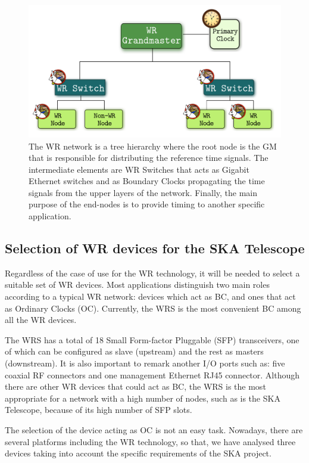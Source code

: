 \begin{figure}[H] \centering \includegraphics[scale=0.4]{img/wr_hierarchy}
	\caption{The WR network is a tree hierarchy where the root node is the
	GM that is responsible for distributing the reference time signals. The
	intermediate elements are WR Switches that acts as Gigabit Ethernet
	switches and as Boundary Clocks propagating the time signals from the
	upper layers of the network. Finally, the main purpose of the end-nodes
	is to provide timing to another specific application.}
\label{fig:wr_hierarchy} \end{figure}

\subsection{Selection of WR devices for the SKA Telescope} \label{subsec:wr-dev}

Regardless of the case of use for the WR technology, it will be needed to select
a suitable set of WR devices. Most applications distinguish two main roles
according to a typical WR network: devices which act as BC, and ones that act as
Ordinary Clocks (OC). Currently, the WRS \cite{ohwr:wrs} is the most convenient
BC among all the WR devices. 

The WRS has a total of 18 Small Form-factor Pluggable (SFP) transceivers, one 
of which can be configured as slave (upstream) and the rest as masters 
(downstream). It is also important to remark another I/O ports such as: five 
coaxial RF connectors and one management Ethernet RJ45 connector. Although 
there are other WR devices that could act as BC, the WRS is the most 
appropriate for a network with a high number of nodes, such as is the SKA 
Telescope, because of its high number of SFP slots.

The selection of the device acting as OC is not an easy task. Nowadays, there
are several platforms including the WR technology, so that, we have analysed
three devices taking into account the specific requirements of the SKA project.

